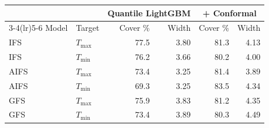 \begin{tabular}{llrrrr}
\toprule
 & & \multicolumn{2}{c}{Quantile LightGBM} & \multicolumn{2}{c}{+ Conformal} \\
\cmidrule(lr){3-4}\cmidrule(lr){5-6}
Model & Target & Cover \% & Width & Cover \% & Width \\
\midrule
IFS & $T_{\max}$ & 77.5 & 3.80 & 81.3 & 4.13 \\
IFS & $T_{\min}$ & 76.2 & 3.66 & 80.2 & 4.00 \\
AIFS & $T_{\max}$ & 73.4 & 3.25 & 81.4 & 3.89 \\
AIFS & $T_{\min}$ & 69.3 & 3.25 & 83.5 & 4.34 \\
GFS & $T_{\max}$ & 75.9 & 3.83 & 81.2 & 4.35 \\
GFS & $T_{\min}$ & 73.4 & 3.89 & 80.3 & 4.49 \\
\bottomrule
\end{tabular}